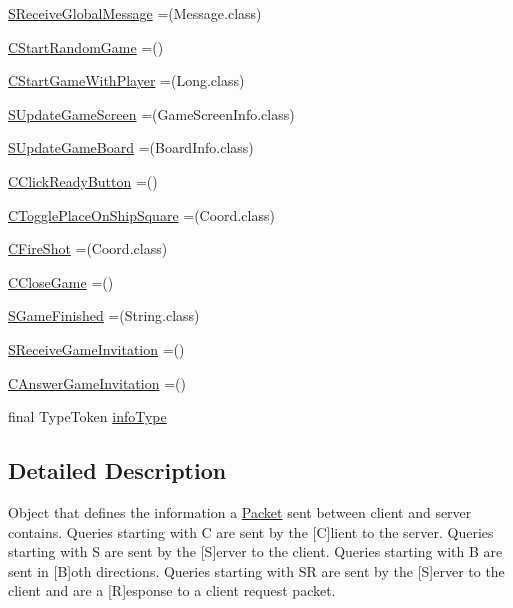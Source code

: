 \begin{DoxyCompactItemize}
\item 
\hyperlink{enumsharedlib_1_1conn_1_1_query_a76fcfb3d9ac59f2ed513e76d324b4c88}{S\+Receive\+Global\+Message} =(Message.\+class)
\item 
\hyperlink{enumsharedlib_1_1conn_1_1_query_aac53d6c92650e86009f75319e808d02b}{C\+Start\+Random\+Game} =()
\item 
\hyperlink{enumsharedlib_1_1conn_1_1_query_afd7008679cab67b543ca7a83d1538c95}{C\+Start\+Game\+With\+Player} =(Long.\+class)
\item 
\hyperlink{enumsharedlib_1_1conn_1_1_query_a167840e91edf75faabd1a05c7818f7cb}{S\+Update\+Game\+Screen} =(Game\+Screen\+Info.\+class)
\item 
\hyperlink{enumsharedlib_1_1conn_1_1_query_ae0f80c1890732270ea7d20921a599f55}{S\+Update\+Game\+Board} =(Board\+Info.\+class)
\item 
\hyperlink{enumsharedlib_1_1conn_1_1_query_af12eeca0b0f06cfde5cac9d2b8a9b7c3}{C\+Click\+Ready\+Button} =()
\item 
\hyperlink{enumsharedlib_1_1conn_1_1_query_a45b6f1768f92f9e9db98221c80217ebb}{C\+Toggle\+Place\+On\+Ship\+Square} =(Coord.\+class)
\item 
\hyperlink{enumsharedlib_1_1conn_1_1_query_af209e818f10f549b31d697a713e0c497}{C\+Fire\+Shot} =(Coord.\+class)
\item 
\hyperlink{enumsharedlib_1_1conn_1_1_query_aaf769eea78a5d5c66224ab8492383724}{C\+Close\+Game} =()
\item 
\hyperlink{enumsharedlib_1_1conn_1_1_query_a1946b23695285c3144c5241c073eaf2d}{S\+Game\+Finished} =(String.\+class)
\item 
\hyperlink{enumsharedlib_1_1conn_1_1_query_ab360a0406c246d18e767e4768362621a}{S\+Receive\+Game\+Invitation} =()
\item 
\hyperlink{enumsharedlib_1_1conn_1_1_query_ac4c7ec95ccd11a96e28a7f8867fb0234}{C\+Answer\+Game\+Invitation} =()
\item 
final Type\+Token \hyperlink{enumsharedlib_1_1conn_1_1_query_aa47f95cd7114e74188a26eca106cdfd6}{info\+Type}
\end{DoxyCompactItemize}


\subsection{Detailed Description}
Object that defines the information a \hyperlink{classsharedlib_1_1conn_1_1_packet}{Packet} sent between client and server contains. Queries starting with \textquotesingle{}C\textquotesingle{} are sent by the \mbox{[}C\mbox{]}lient to the server. Queries starting with \textquotesingle{}S\textquotesingle{} are sent by the \mbox{[}S\mbox{]}erver to the client. Queries starting with \textquotesingle{}B\textquotesingle{} are sent in \mbox{[}B\mbox{]}oth directions. Queries starting with \textquotesingle{}SR\textquotesingle{} are sent by the \mbox{[}S\mbox{]}erver to the client and are a \mbox{[}R\mbox{]}esponse to a client request packet. 


